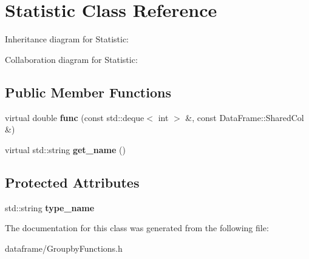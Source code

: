 \hypertarget{classStatistic}{}\section{Statistic Class Reference}
\label{classStatistic}


Inheritance diagram for Statistic\+:


Collaboration diagram for Statistic\+:
\subsection*{Public Member Functions}
\begin{DoxyCompactItemize}
\item 
\mbox{\label{classStatistic_ae31ffb0b5ee2bb195f78d774159ac743}} 
virtual double {\bfseries func} (const std\+::deque$<$ int $>$ \&, const Data\+Frame\+::\+Shared\+Col \&)
\item 
\mbox{\label{classStatistic_ad35bf999ca083408d4e6cf0f09236775}} 
virtual std\+::string {\bfseries get\+\_\+name} ()
\end{DoxyCompactItemize}
\subsection*{Protected Attributes}
\begin{DoxyCompactItemize}
\item 
\mbox{\label{classStatistic_ab772f6a95311fbfd0657c5df29d05b9b}} 
std\+::string {\bfseries type\+\_\+name}
\end{DoxyCompactItemize}


The documentation for this class was generated from the following file\+:\begin{DoxyCompactItemize}
\item 
dataframe/Groupby\+Functions.\+h\end{DoxyCompactItemize}
